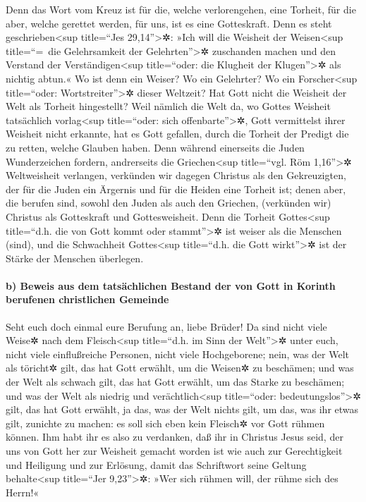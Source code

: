  Denn das Wort vom Kreuz ist für die, welche
verlorengehen, eine Torheit, für die aber, welche gerettet werden, für
uns, ist es eine Gotteskraft.  Denn es steht
geschrieben\textless sup title=``Jes 29,14''\textgreater✲: »Ich will die
Weisheit der Weisen\textless sup title=``=~die Gelehrsamkeit der
Gelehrten''\textgreater✲ zuschanden machen und den Verstand der
Verständigen\textless sup title=``oder: die Klugheit der
Klugen''\textgreater✲ als nichtig abtun.«  Wo ist denn
ein Weiser? Wo ein Gelehrter? Wo ein Forscher\textless sup title=``oder:
Wortstreiter''\textgreater✲ dieser Weltzeit? Hat Gott nicht die Weisheit
der Welt als Torheit hingestellt?  Weil nämlich die Welt
da, wo Gottes Weisheit tatsächlich vorlag\textless sup title=``oder:
sich offenbarte''\textgreater✲, Gott vermittelst ihrer Weisheit nicht
erkannte, hat es Gott gefallen, durch die Torheit der Predigt die zu
retten, welche Glauben haben.  Denn während einerseits
die Juden Wunderzeichen fordern, andrerseits die Griechen\textless sup
title=``vgl. Röm 1,16''\textgreater✲ Weltweisheit verlangen,
 verkünden wir dagegen Christus als den Gekreuzigten, der
für die Juden ein Ärgernis und für die Heiden eine Torheit ist;
 denen aber, die berufen sind, sowohl den Juden als auch
den Griechen, (verkünden wir) Christus als Gotteskraft und
Gottesweisheit.  Denn die Torheit Gottes\textless sup
title=``d.h. die von Gott kommt oder stammt''\textgreater✲ ist weiser
als die Menschen (sind), und die Schwachheit Gottes\textless sup
title=``d.h. die Gott wirkt''\textgreater✲ ist der Stärke der Menschen
überlegen.

\hypertarget{b-beweis-aus-dem-tatsuxe4chlichen-bestand-der-von-gott-in-korinth-berufenen-christlichen-gemeinde}{%
\paragraph{b) Beweis aus dem tatsächlichen Bestand der von Gott in
Korinth berufenen christlichen
Gemeinde}\label{b-beweis-aus-dem-tatsuxe4chlichen-bestand-der-von-gott-in-korinth-berufenen-christlichen-gemeinde}}

 Seht euch doch einmal eure Berufung an, liebe Brüder! Da
sind nicht viele Weise✲ nach dem Fleisch\textless sup title=``d.h. im
Sinn der Welt''\textgreater✲ unter euch, nicht viele einflußreiche
Personen, nicht viele Hochgeborene;  nein, was der Welt
als töricht✲ gilt, das hat Gott erwählt, um die Weisen✲ zu beschämen;
und was der Welt als schwach gilt, das hat Gott erwählt, um das Starke
zu beschämen;  und was der Welt als niedrig und
verächtlich\textless sup title=``oder: bedeutungslos''\textgreater✲
gilt, das hat Gott erwählt, ja das, was der Welt nichts gilt, um das,
was ihr etwas gilt, zunichte zu machen:  es soll sich
eben kein Fleisch✲ vor Gott rühmen können.  Ihm habt ihr
es also zu verdanken, daß ihr in Christus Jesus seid, der uns von Gott
her zur Weisheit gemacht worden ist wie auch zur Gerechtigkeit und
Heiligung und zur Erlösung,  damit das Schriftwort seine
Geltung behalte\textless sup title=``Jer 9,23''\textgreater✲: »Wer sich
rühmen will, der rühme sich des Herrn!«

